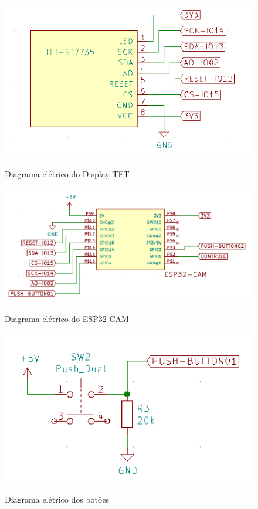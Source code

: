 \begin{figure}[h!]
    \centering
    \caption{Diagrama elétrico do Display TFT}
    \includegraphics[scale=0.4]{figuras/modulo_tft.png}
    \fonte{}%
    \label{fig:diagramatft}
    \centering
\end{figure}

\begin{figure}[h!]
    \centering
    \caption{Diagrama elétrico do ESP32-CAM}
    \includegraphics[scale=0.35]{figuras/modulo_esp.png}
    \fonte{}%
    \label{fig:diagramaesp}
    \centering
\end{figure}

\begin{figure}[h!]
    \centering
    \caption{Diagrama elétrico dos botões}
    \includegraphics[scale=0.4]{figuras/modulo-push-button.png}
    \fonte{}%
    \label{fig:diagramabotoes}
    \centering
\end{figure}

